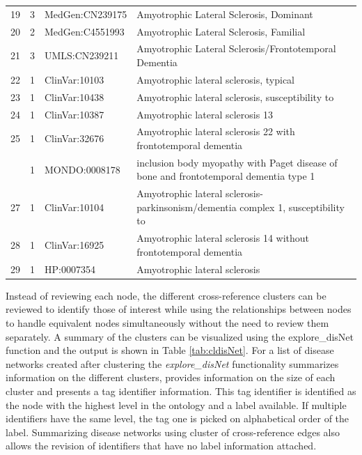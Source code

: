 \documentclass[9pt,a4paper,]{extarticle}
\begin{document}
\begin{table}
{\begin{tabular}[t]{rrll}
\rowcolor{gray!6}  19 & 3 & MedGen:CN239175 & Amyotrophic Lateral Sclerosis, Dominant\\
20 & 2 & MedGen:C4551993 & Amyotrophic Lateral Sclerosis, Familial\\
\addlinespace
\rowcolor{gray!6}  21 & 3 & UMLS:CN239211 & Amyotrophic Lateral Sclerosis/Frontotemporal Dementia\\
22 & 1 & ClinVar:10103 & Amyotrophic lateral sclerosis, typical\\
\rowcolor{gray!6}  23 & 1 & ClinVar:10438 & Amyotrophic lateral sclerosis, susceptibility to\\
24 & 1 & ClinVar:10387 & Amyotrophic lateral sclerosis 13\\
\rowcolor{gray!6}  25 & 1 & ClinVar:32676 & Amyotrophic lateral sclerosis 22 with frontotemporal dementia\\
\addlinespace
26 & 1 & MONDO:0008178 & inclusion body myopathy with Paget disease of bone and frontotemporal dementia type 1\\
\rowcolor{gray!6}  27 & 1 & ClinVar:10104 & Amyotrophic lateral sclerosis-parkinsonism/dementia complex 1, susceptibility to\\
28 & 1 & ClinVar:16925 & Amyotrophic lateral sclerosis 14 without frontotemporal dementia\\
\rowcolor{gray!6}  29 & 1 & HP:0007354 & Amyotrophic lateral sclerosis\\
\bottomrule
\end{tabular}}
\end{table}

Instead of reviewing each node, the different cross-reference clusters can be reviewed to identify those of interest while using the relationships between nodes to handle equivalent nodes simultaneously without the need to review them separately. A summary of the clusters can be visualized using the explore\_disNet function and the output is shown in Table \ref{tab:cldisNet}. For a list of disease networks created after clustering the \emph{explore\_disNet} functionality summarizes information on the different clusters, provides information on the size of each cluster and presents a tag identifier information. This tag identifier is identified as the node with the highest level in the ontology and a label available. If multiple identifiers have the same level, the tag one is picked on alphabetical order of the label. Summarizing disease networks using cluster of cross-reference edges also allows the revision of identifiers that have no label information attached.
\end{document}
